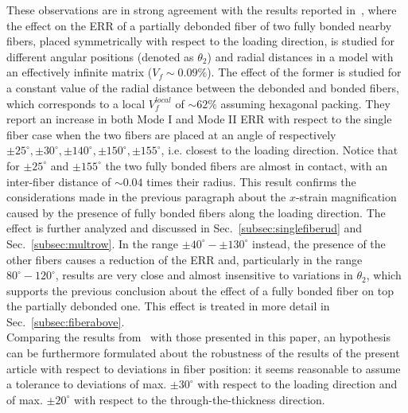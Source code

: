 \documentclass[review]{elsarticle}
\begin{document}
These observations are in strong agreement with the results reported in~\cite{Sandino2016}, where the effect on the ERR of a partially debonded fiber of two fully bonded nearby fibers, placed symmetrically with respect to the loading direction, is studied for different angular positions (denoted as $\theta_{2}$) and radial distances in a model with an effectively infinite matrix ($V_{f}\sim0.09\%$). The effect of the former is studied for a constant value of the radial distance between the debonded and bonded fibers, which corresponds to a local $V_{f}^{local}$ of $\sim62\%$ assuming hexagonal packing. They report an increase in both Mode I and Mode II ERR with respect to the single fiber case when the two fibers are placed at an angle of respectively $\pm25^{\circ},\pm30^{\circ},\pm140^{\circ},\pm150^{\circ},\pm155^{\circ}$, i.e. closest to the loading direction. Notice that for $\pm25^{\circ}$ and $\pm155^{\circ}$ the two fully bonded fibers are almost in contact, with an inter-fiber distance of $\sim0.04$ times their radius. This result confirms the considerations made in the previous paragraph about the $x$-strain magnification caused by the presence of fully bonded fibers along the loading direction. The effect is further analyzed and discussed in Sec.~\ref{subsec:singlefiberud} and Sec.~\ref{subsec:multrow}. In the range $\pm40^{\circ}-\pm130^{\circ}$ instead, the presence of the other fibers causes a reduction of the ERR and, particularly in the range $80^{\circ}-120^{\circ}$, results are very close and almost insensitive to variations in $\theta_{2}$, which supports the previous conclusion about the effect of a fully bonded fiber on top the partially debonded one. This effect is treated in more detail in Sec.~\ref{subsec:fiberabove}.\\
Comparing the results from~\cite{Sandino2016} with those presented in this paper, an hypothesis can be furthermore formulated about the robustness of the results of the present article with respect to deviations in fiber position: it seems reasonable to assume a tolerance to deviations of max. $\pm30^{\circ}$ with respect to the loading direction and of max. $\pm20^{\circ}$ with respect to the through-the-thickness direction.\\
\end{document}
